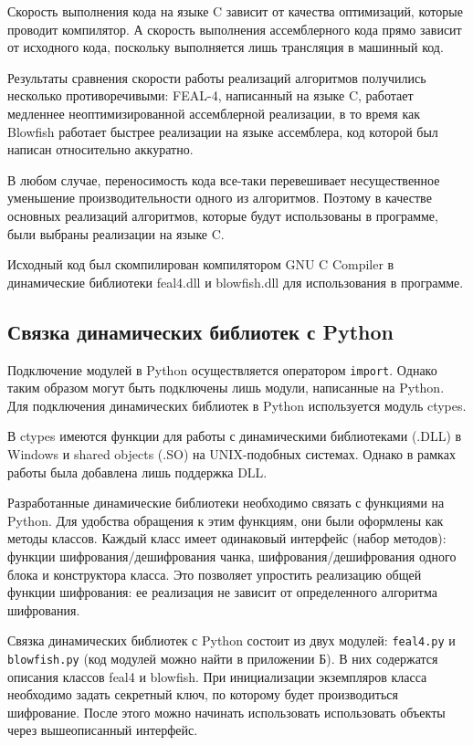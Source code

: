 Скорость выполнения кода на языке C зависит от качества оптимизаций,
которые проводит компилятор. А скорость выполнения ассемблерного кода
прямо зависит от исходного кода, поскольку выполняется лишь трансляция
в машинный код.

Результаты сравнения скорости работы реализаций алгоритмов получились
несколько противоречивыми: FEAL-4, написанный на языке C, работает медленнее
неоптимизированной ассемблерной реализации, в то время как Blowfish работает
быстрее реализации на языке ассемблера, код которой был написан
относительно аккуратно.

В любом случае, переносимость кода все-таки перевешивает несущественное
уменьшение производительности одного из алгоритмов. Поэтому в качестве
основных реализаций алгоритмов, которые будут использованы в программе,
были выбраны реализации на языке C.

Исходный код был скомпилирован компилятором GNU C Compiler в динамические
библиотеки feal4.dll и blowfish.dll для использования в программе.

\newpage
\subsection{Связка динамических библиотек с Python}\label{ssec:python-algo-bindings} %

Подключение модулей в Python осуществляется оператором \texttt{import}.
Однако таким образом могут быть подключены лишь модули, написанные
на Python. Для подключения динамических библиотек в Python
используется модуль ctypes.

В ctypes имеются функции для работы с динамическими библиотеками (.DLL)
в Windows и shared objects (.SO) на UNIX-подобных системах.
Однако в рамках работы была добавлена лишь поддержка DLL.

Разработанные динамические библиотеки необходимо связать с функциями
на Python. Для удобства обращения к этим функциям, они были оформлены
как методы классов. Каждый класс имеет одинаковый интерфейс (набор методов):
функции шифрования/дешифрования чанка, шифрования/дешифрования
одного блока и конструктора класса. Это позволяет упростить реализацию
общей функции шифрования: ее реализация не зависит от определенного
алгоритма шифрования.

Связка динамических библиотек с Python состоит из двух модулей:
\texttt{feal4.py} и \texttt{blowfish.py} (код модулей можно найти в приложении Б).
В них содержатся описания классов feal4 и blowfish. При инициализации
экземпляров класса необходимо задать секретный ключ, по которому будет
производиться шифрование. После этого можно начинать использовать использовать
объекты через вышеописанный интерфейс.

